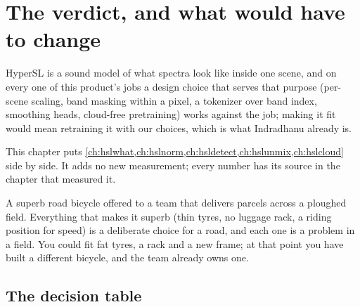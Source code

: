 \chapter{The verdict, and what would have to change}\label{ch:hslverdict}
\def\tbrk{\hfil\penalty50\hfilneg}%

\begin{onething}
HyperSL is a sound model of what spectra look like inside one scene, and on every one of this product's jobs a design
choice that serves that purpose (per-scene scaling, band masking within a pixel, a tokenizer over band index, smoothing
heads, cloud-free pretraining) works against the job; making it fit would mean retraining it with our choices, which is
what Indradhanu already is.
\end{onething}

This chapter puts \cref{ch:hslwhat,ch:hslnorm,ch:hsldetect,ch:hslunmix,ch:hslcloud} side by side. It adds no new
measurement; every number has its source in the chapter that measured it.

\begin{analogy}
A superb road bicycle offered to a team that delivers parcels across a ploughed field. Everything that makes it superb
(thin tyres, no luggage rack, a riding position for speed) is a deliberate choice for a road, and each one is a problem in
a field. You could fit fat tyres, a rack and a new frame; at that point you have built a different bicycle, and the team
already owns one.
\end{analogy}

\section{The decision table}\label{sec:hslverdict:table}

